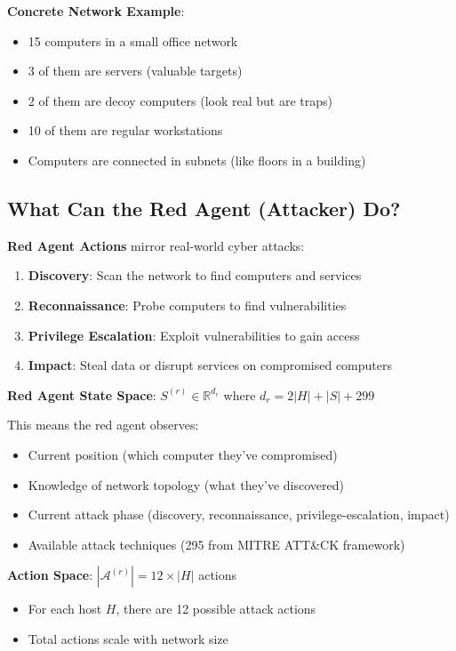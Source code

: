 \documentclass[11pt]{article}
\begin{document}
\begin{example}
\textbf{Concrete Network Example}:
\begin{itemize}
\item 15 computers in a small office network
\item 3 of them are servers (valuable targets)
\item 2 of them are decoy computers (look real but are traps)
\item 10 of them are regular workstations
\item Computers are connected in subnets (like floors in a building)
\end{itemize}
\end{example}

\subsection{What Can the Red Agent (Attacker) Do?}

\begin{intuition}
\textbf{Red Agent Actions} mirror real-world cyber attacks:
\begin{enumerate}
\item \textbf{Discovery}: Scan the network to find computers and services
\item \textbf{Reconnaissance}: Probe computers to find vulnerabilities
\item \textbf{Privilege Escalation}: Exploit vulnerabilities to gain access
\item \textbf{Impact}: Steal data or disrupt services on compromised computers
\end{enumerate}
\end{intuition}

\begin{mathdetails}
\textbf{Red Agent State Space}: $S^{(r)} \in \mathbb{R}^{d_r}$ where $d_r = 2|H| + |S| + 299$

This means the red agent observes:
\begin{itemize}
\item Current position (which computer they've compromised)
\item Knowledge of network topology (what they've discovered)
\item Current attack phase (discovery, reconnaissance, privilege-escalation, impact)
\item Available attack techniques (295 from MITRE ATT\&CK framework)
\end{itemize}

\textbf{Action Space}: $|\mathcal{A}^{(r)}| = 12 \times |H|$ actions
\begin{itemize}
\item For each host $H$, there are 12 possible attack actions
\item Total actions scale with network size
\end{itemize}
\end{mathdetails}
\end{document}
